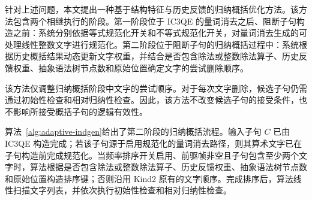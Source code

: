 \documentclass[11pt,a4paper]{article}
\begin{document}
针对上述问题，本文提出一种基于结构特征与历史反馈的归纳概括优化方法。该方法包含两个相继执行的阶段。第一阶段位于 IC3QE 的量词消去之后、阻断子句构造之前：系统分别依据等式规范化开关和不等式规范化开关，对量词消去生成的可处理线性整数文字进行规范化。第二阶段位于阻断子句的归纳概括过程中：系统根据历史概括结果动态更新文字权重，并结合是否包含除法或整数除法算子、历史反馈权重、抽象语法树节点数和原始位置确定文字的尝试删除顺序。

该方法仅调整归纳概括阶段中文字的尝试顺序。对于每次文字删除，候选子句仍需通过初始性检查和相对归纳性检查。因此，该方法不改变候选子句的接受条件，也不影响所接受概括子句的逻辑有效性。

算法~\ref{alg:adaptive-indgen}给出了第二阶段的归纳概括流程。输入子句 $C$ 已由 IC3QE 构造完成；若该子句源于启用规范化的量词消去路径，则其算术文字已在子句构造前完成规范化。当频率排序开关启用、前驱帧非空且子句包含至少两个文字时，算法根据是否包含除法或整数除法算子、历史反馈权重、抽象语法树节点数和原始位置构造排序键；否则沿用 Kind2 原有的文字顺序。完成排序后，算法线性扫描文字列表，并依次执行初始性检查和相对归纳性检查。
\end{document}
